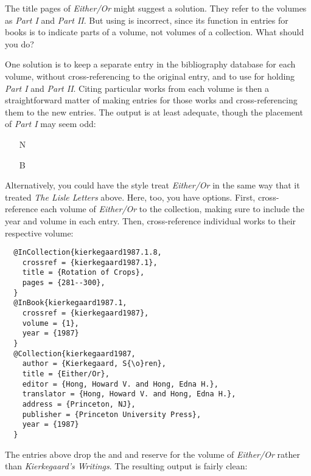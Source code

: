 \documentclass[11pt,letterpaper,oneside]{article}
\begin{document}
The title pages of \textit{Either/Or} might suggest a solution. They
refer to the volumes as \textit{Part I} and \textit{Part II}. But
using  is incorrect, since its function in entries for
books is to indicate parts of a volume, not volumes of a collection.
What should you do?

One solution is to keep a separate entry in the bibliography database
for each volume, without cross-referencing to the original entry, and
to use  for holding \textit{Part I} and \textit{Part
II}. Citing particular works from each volume is then a
straightforward matter of making  entries for
those works and cross-referencing them to the new 
entries. The output is at least adequate, though the placement of
\textit{Part I} may seem odd:

\begin{itemize}
\item[N] 

\item[B] 
\end{itemize}

\noindent Alternatively, you could have the style treat
\textit{Either/Or} in the same way that it treated \textit{The Lisle
Letters} above. Here, too, you have options. First, cross-reference
each volume of \textit{Either/Or} to the collection, making sure to
include the year and volume in each  entry. Then,
cross-reference individual works to their respective volume:

\begin{lstlisting}
  @InCollection{kierkegaard1987.1.8,
    crossref = {kierkegaard1987.1},
    title = {Rotation of Crops},
    pages = {281--300},
  }
  @InBook{kierkegaard1987.1,
    crossref = {kierkegaard1987},
    volume = {1},
    year = {1987}
  }
  @Collection{kierkegaard1987,
    author = {Kierkegaard, S{\o}ren},
    title = {Either/Or},
    editor = {Hong, Howard V. and Hong, Edna H.},
    translator = {Hong, Howard V. and Hong, Edna H.},
    address = {Princeton, NJ},
    publisher = {Princeton University Press},
    year = {1987}
  }
\end{lstlisting}

\noindent The entries above drop the  and
 and reserve  for the volume of
\textit{Either/Or} rather than \textit{Kierkegaard's Writings}. The
resulting output is fairly clean:
\end{document}
